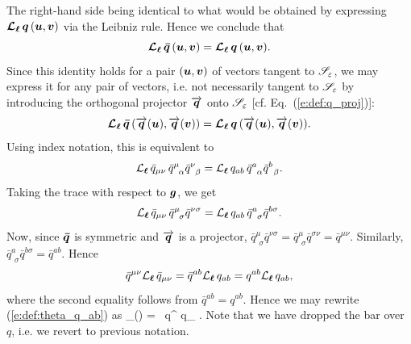 The right-hand side being identical to what would be obtained by expressing
$\bm{\mathcal{L}}_{\bm{\ell}}\, \bm{q} \, (\bm{u},\bm{v})$ via the Leibniz rule. Hence we conclude
that
\[
    \bm{\mathcal{L}}_{\bm{\ell}}\, \bm{\bar q} \, (\bm{u},\bm{v}) = \bm{\mathcal{L}}_{\bm{\ell}}\, \bm{q} \, (\bm{u},\bm{v}) .
\]
Since this identity holds for a pair $(\bm{u},\bm{v})$ of vectors tangent
to $\mathscr{S}_\varepsilon$, we may express it for any pair of vectors, i.e. not
necessarily tangent to $\mathscr{S}_\varepsilon$ by introducing the orthogonal
projector $\overrightarrow{\bm{q}}$ onto $\mathscr{S}_\varepsilon$ [cf. Eq.~(\ref{e:def:q_proj})]:
\[
    \bm{\mathcal{L}}_{\bm{\ell}}\, \bm{\bar q} \, (\overrightarrow{\bm{q}}(\bm{u}),\overrightarrow{\bm{q}}(\bm{v})) =
    \bm{\mathcal{L}}_{\bm{\ell}}\, \bm{q} \, (\overrightarrow{\bm{q}}(\bm{u}),\overrightarrow{\bm{q}}(\bm{v})) .
\]
Using index notation, this is equivalent to
\[
    \Liec{\el} {\bar q}_{\mu\nu} \, {\bar q}^\mu_{\ \, \alpha} {\bar q}^\nu_{\ \, \beta} =
        \Liec{\el} {q}_{ab} \, {\bar q}^a_{\ \, \alpha} {\bar q}^b_{\ \, \beta} .
\]
Taking the trace with respect to $\bm{g}$, we get
\[
    \Liec{\el} {\bar q}_{\mu\nu} \, {\bar q}^\mu_{\ \, \sigma} {\bar q}^{\nu\sigma} =
        \Liec{\el} {q}_{ab} \, {\bar q}^a_{\ \, \sigma} {\bar q}^{b\sigma} .
\]
Now, since $\bm{\bar q}$ is symmetric and $\overrightarrow{\bm{q}}$ is a projector,
${\bar q}^\mu_{\ \, \sigma} {\bar q}^{\nu\sigma} = {\bar q}^\mu_{\ \, \sigma} {\bar q}^{\sigma\nu}
 = {\bar q}^{\mu\nu}$. Similarly, ${\bar q}^a_{\ \, \sigma} {\bar q}^{b\sigma} = {\bar q}^{ab}$.
Hence
\[
    {\bar q}^{\mu\nu} {\mathcal{L}}_{\bm{\ell}}\, {\bar q}_{\mu\nu} = {\bar q}^{ab}  {\mathcal{L}}_{\bm{\ell}}\, {q}_{ab}
    = q^{ab}  {\mathcal{L}}_{\bm{\ell}}\, {q}_{ab} ,
\]
where the second equality follows from
${\bar q}^{ab}  = q^{ab}$.
Hence we may rewrite (\ref{e:def:theta_q_ab}) as
\be \label{e:def:theta_q_munu}
    \theta_{(\wl)} =  \, q^{\mu\nu} \Liec{\el} q_{\mu\nu} .
\ee
Note that we have dropped the bar over $q$, i.e. we revert to previous notation.


